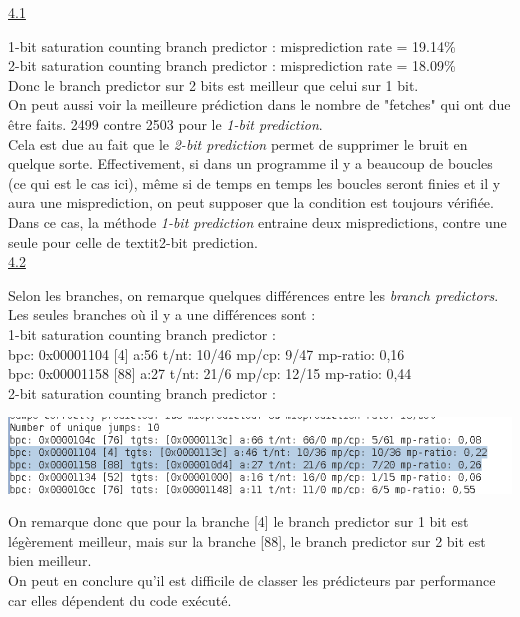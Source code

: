 \documentclass[a4paper,12pt]{article}
\begin{document}
	\underline{4.1}\\
		\par
		1-bit saturation counting branch predictor : misprediction rate = 19.14\%\\
		2-bit saturation counting branch predictor : misprediction rate = 18.09\%\\
		Donc le branch predictor sur 2 bits est meilleur que celui sur 1 bit.\\
		On peut aussi voir la meilleure prédiction dans le nombre de "fetches" qui ont due être faits. 2499 contre 2503 pour le \textit{1-bit prediction}.\\
		Cela est due au fait que le \textit{2-bit prediction} permet de supprimer le bruit en quelque sorte.
		Effectivement, si dans un programme il y a beaucoup de boucles (ce qui est le cas ici), même si de temps en temps les boucles seront finies et il y aura une misprediction, on peut supposer que la condition est toujours vérifiée.\\
		Dans ce cas, la méthode \textit{1-bit prediction} entraine deux mispredictions, contre une seule pour celle de textit{2-bit prediction}.\\

	\underline{4.2}\\
		\par
		Selon les branches, on remarque quelques différences entre les \textit{branch predictors}.\\
		Les seules branches où il y a une différences sont :\\
		1-bit saturation counting branch predictor :\\
		bpc: 0x00001104 [4] a:56 t/nt: 10/46 mp/cp: 9/47 mp-ratio: 0,16\\
		bpc: 0x00001158 [88] a:27 t/nt: 21/6 mp/cp: 12/15 mp-ratio: 0,44\\
		2-bit saturation counting branch predictor :\\
		\begin{center}
			\includegraphics[width=\linewidth]{img/5}
		\end{center}
		On remarque donc que pour la branche [4] le branch predictor sur 1 bit est légèrement meilleur, mais sur la branche [88], le branch predictor sur 2 bit est bien meilleur.\\
		On peut en conclure qu'il est difficile de classer les prédicteurs par performance car elles dépendent du code exécuté.\\
\end{document}

